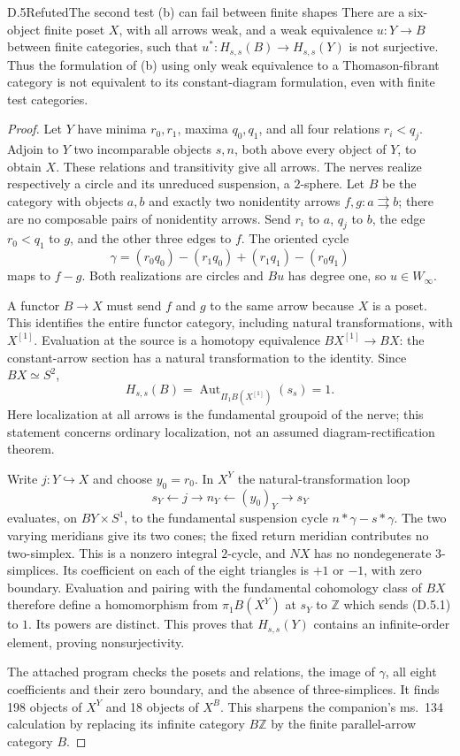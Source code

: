 \begin{result}{D.5}{Refuted}{The second test (b) can fail between finite shapes}
There are a six-object finite poset $X$, with all arrows weak, and a
weak equivalence $u:Y\to B$ between finite categories, such that
$u^*:H_{s,s}(B)\to H_{s,s}(Y)$ is not surjective.
Thus the formulation of (b) using only weak equivalence to a
Thomason-fibrant category is not equivalent to its constant-diagram
formulation, even with finite test categories.
\end{result}
\begin{proof}
Let $Y$ have minima $r_0,r_1$, maxima $q_0,q_1$, and all four
relations $r_i<q_j$. Adjoin to $Y$ two incomparable objects $s,n$,
both above every object of $Y$, to obtain $X$. These relations and
transitivity give all arrows. The nerves realize respectively a
circle and its unreduced suspension, a $2$-sphere. Let $B$ be the
category with objects $a,b$ and exactly two nonidentity arrows
$f,g:a\rightrightarrows b$; there are no composable pairs of
nonidentity arrows. Send $r_i$ to $a$, $q_j$ to $b$, the edge
$r_0<q_1$ to $g$, and the other three edges to $f$.
The oriented cycle
\[
 \gamma=(r_0q_0)-(r_1q_0)+(r_1q_1)-(r_0q_1)
\]
maps to $f-g$. Both realizations are circles and $Bu$ has degree one,
so $u\in W_\infty$.

A functor $B\to X$ must send $f$ and $g$ to the same arrow because
$X$ is a poset. This identifies the entire functor category, including
natural transformations, with $X^{[1]}$. Evaluation at the source is
a homotopy equivalence $BX^{[1]}\to BX$: the constant-arrow section
has a natural transformation to the identity. Since $BX\simeq S^2$,
\[
 H_{s,s}(B)=\operatorname{Aut}_{\Pi_1 B(X^{[1]})}(s_s)=1.
\]
Here localization at all arrows is the fundamental groupoid of the
nerve; this statement concerns ordinary localization, not an assumed
diagram-rectification theorem.

Write $j:Y\hookrightarrow X$ and choose $y_0=r_0$. In $X^Y$ the
natural-transformation loop
\[
 s_Y\longleftarrow j\longrightarrow n_Y
       \longleftarrow(y_0)_Y\longrightarrow s_Y                 \tag{D.5.1}
\]
evaluates, on $BY\times S^1$, to the fundamental suspension cycle
$n*\gamma-s*\gamma$. The two varying meridians give its two cones;
the fixed return meridian contributes no two-simplex. This is a
nonzero integral $2$-cycle, and $NX$ has no nondegenerate
$3$-simplices. Its coefficient on each of the eight triangles is
$+1$ or $-1$, with zero boundary. Evaluation and pairing with the
fundamental cohomology class of $BX$ therefore define a homomorphism
from $\pi_1 B(X^Y)$ at $s_Y$ to $\mathbb Z$ which sends (D.5.1) to
$1$. Its powers are distinct. This proves that $H_{s,s}(Y)$ contains
an infinite-order element, proving nonsurjectivity.

The attached program checks the posets and relations, the image of
$\gamma$, all eight coefficients and their zero boundary, and the
absence of three-simplices. It finds 198 objects of $X^Y$ and 18
objects of $X^B$. This sharpens the companion's ms.~134 calculation
by replacing its infinite category $B\mathbb Z$ by the finite
parallel-arrow category $B$.
\end{proof}

